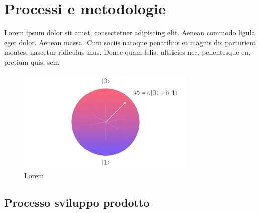 \chapter{Processi e metodologie}
\label{chap:processi-metodologie}

Lorem ipsum dolor sit amet, consectetuer adipiscing elit. Aenean commodo ligula eget dolor. Aenean massa. Cum sociis natoque penatibus et magnis dis parturient montes, nascetur ridiculus mus. Donec quam felis, ultricies nec, pellentesque eu, pretium quis, sem.

\cite{article:spooky}

\begin{figure}[h]
    \centering
    \includegraphics[height=5cm]{img/qubit.jpeg}
    \caption{Lorem}
    \label{fig:qubit}
\end{figure}

\lipsum[1]

\section{Processo sviluppo prodotto}
